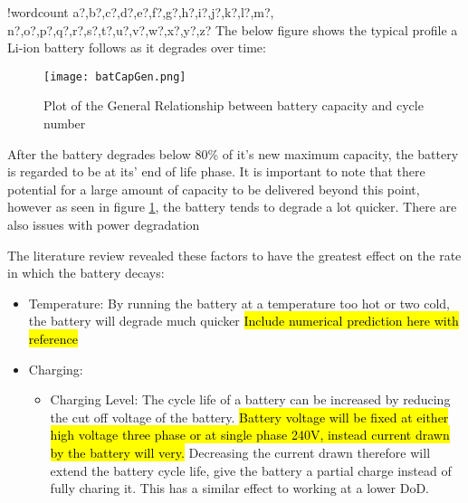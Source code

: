 \documentclass[fontsize=9.5pt]{extarticle}
\numberwithin{figure}{section} %
\providecommand{\tightlist}{%
  \setlength{\itemsep}{0pt}\setlength{\parskip}{0pt}}
\newcounter{words}
\newenvironment{counted}{%
  \setcounter{words}{0}
  \SearchList!{wordcount}{\stepcounter{words}}
    {a?,b?,c?,d?,e?,f?,g?,h?,i?,j?,k?,l?,m?,
    n?,o?,p?,q?,r?,s?,t?,u?,v?,w?,x?,y?,z?}
  \UndoBoundary{'}
  \SearchOrder{p;}}{%
  \StopSearching}
\begin{document}
\begin{counted}
The below figure shows the typical profile a Li-ion battery follows as
it degrades over time:

\begin{figure}[H]
  \centering
  \texttt{[image: batCapGen.png]}
  \caption{Plot of the General Relationship between battery capacity and cycle number \cite{spotnitz2003simulation} }
  \label{batCapGen}
\end{figure}

After the battery degrades below 80\% of it's new maximum capacity, the
battery is regarded to be at its' end of life phase. It is important to
note that there potential for a large amount of capacity to be delivered
beyond this point, however as seen in figure \ref{batCapGen}, the
battery tends to degrade a lot quicker. There are also issues with power
degradation

The literature review revealed these factors to have the greatest effect
on the rate in which the battery decays:

\begin{itemize}
\item
  Temperature: By running the battery at a temperature too hot or two
  cold, the battery will degrade much quicker
  \hl{Include numerical prediction here with reference}
  \cite{rong2006analytical}
\item
  Charging:

  \begin{itemize}
  \tightlist
  \item
    Charging Level: The cycle life of a battery can be increased by
    reducing the cut off voltage of the battery.
    \hl{Battery voltage will be fixed at either high voltage three phase or at single phase 240V, instead current drawn by the battery will very.}
    Decreasing the current drawn therefore will extend the battery cycle
    life, give the battery a partial charge instead of fully charing it.
    This has a similar effect to working at a lower DoD.
    \cite{Choi2002130}


\end{itemize}
\end{itemize}
\end{counted}
\end{document}

